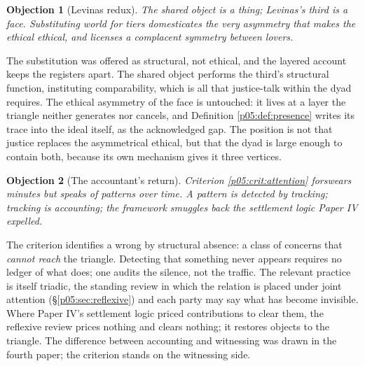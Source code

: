 \documentclass[11pt,a4paper]{article}
\theoremstyle{seriesthm}
\newtheorem{objection}{Objection}
\newenvironment{reply}{\par\noindent{\color{lightgold}\scshape Reply.}\enspace\ignorespaces}{\par}
\begin{document}
\begin{objection}[Levinas redux]
The shared object is a thing; Levinas's third is a face. Substituting world for tiers domesticates the very asymmetry that makes the ethical ethical, and licenses a complacent symmetry between lovers.
\end{objection}
\begin{reply}
The substitution was offered as structural, not ethical, and the layered account keeps the registers apart. The shared object performs the third's structural function, instituting comparability, which is all that justice-talk within the dyad requires. The ethical asymmetry of the face is untouched: it lives at a layer the triangle neither generates nor cancels, and Definition \ref{p05:def:presence} writes its trace into the ideal itself, as the acknowledged gap. The position is not that justice replaces the asymmetrical ethical, but that the dyad is large enough to contain both, because its own mechanism gives it three vertices.
\end{reply}

\begin{objection}[The accountant's return]
Criterion \ref{p05:crit:attention} forswears minutes but speaks of patterns over time. A pattern is detected by tracking; tracking is accounting; the framework smuggles back the settlement logic Paper IV expelled.
\end{objection}
\begin{reply}
The criterion identifies a wrong by structural absence: a class of concerns that \emph{cannot reach} the triangle. Detecting that something never appears requires no ledger of what does; one audits the silence, not the traffic. The relevant practice is itself triadic, the standing review in which the relation is placed under joint attention (§\ref{p05:sec:reflexive}) and each party may say what has become invisible. Where Paper IV's settlement logic priced contributions to clear them, the reflexive review prices nothing and clears nothing; it restores objects to the triangle. The difference between accounting and witnessing was drawn in the fourth paper; the criterion stands on the witnessing side.
\end{reply}
\end{document}
